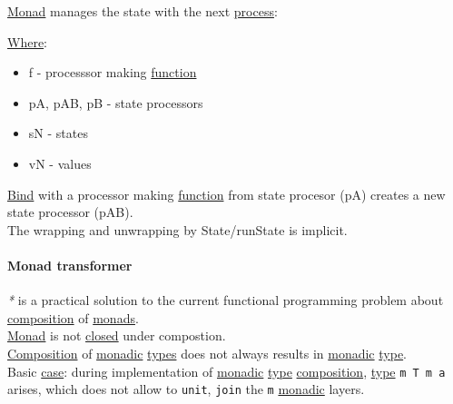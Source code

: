 \documentclass[a4paper,14pt,oneside]{book}
\begin{document}
{\hyperref[org90c21ab]{Monad} manages the state with the next \hyperref[orgada3bb8]{process}:\\

\begin{center}

\end{center}

\hyperref[org5b6b021]{Where}:\\
\begin{itemize}
\item f  - processsor making \hyperref[org6a60524]{function}\\
\item pA, pAB, pB - state processors\\
\item sN - states\\
\item vN - values\\
\end{itemize}
\hyperref[orgdf51845]{Bind} with a processor making \hyperref[org6a60524]{function} from state procesor (pA) creates a new state processor (pAB).\\
The wrapping and unwrapping by State/runState is implicit.\\

\paragraph{\label{orgaf78a14}Monad transformer}
\label{sec:org3ebfc30}
\emph{*} is a practical solution to the current functional programming problem about \hyperref[orgd27cab7]{composition} of \hyperref[org7e5e6f7]{monads}.\\

\hyperref[org90c21ab]{Monad} is not \hyperref[orge092b92]{closed} under compostion.\\
\hyperref[orgd27cab7]{Composition} of \hyperref[orgbea0cab]{monadic} \hyperref[org51532d9]{types} does not always results in \hyperref[orgbea0cab]{monadic} \hyperref[orga9ca243]{type}.\\

Basic \hyperref[org6609611]{case}: during implementation of \hyperref[orgbea0cab]{monadic} \hyperref[orga9ca243]{type} \hyperref[orgd27cab7]{composition}, \hyperref[orga9ca243]{type} \texttt{m T m a} arises, which does not allow to \texttt{unit}, \texttt{join} the \texttt{m} \hyperref[orgbea0cab]{monadic} layers.\\

}
\end{document}

